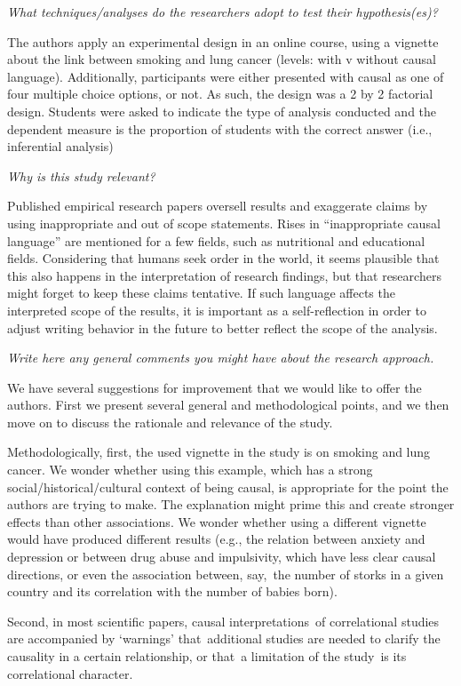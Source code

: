 \documentclass[10pt]{article}
\begin{document}
\emph{What techniques/analyses do the researchers adopt to test their
hypothesis(es)?}

The authors apply an experimental design in an online course, using a
vignette about the link between smoking and lung cancer (levels: with v
without causal language). Additionally, participants were either
presented with causal as one of four multiple choice options, or not. As
such, the design was a 2 by 2 factorial design. Students were asked to
indicate the type of analysis conducted and the dependent measure is the
proportion of students with the correct answer (i.e., inferential
analysis)

\emph{Why is this study relevant?}

Published empirical research papers oversell results and exaggerate
claims by using inappropriate and out of scope statements. Rises in
``inappropriate causal language'' are mentioned for a few fields, such
as nutritional and educational fields. Considering that humans seek
order in the world, it seems plausible that this also happens in the
interpretation of research findings, but that researchers might forget
to keep these claims tentative. If such language affects the interpreted
scope of the results, it is important as a self-reflection in order to
adjust writing behavior in the future to better reflect the scope of the
analysis.~

\emph{Write here any general comments you might have about the research
approach.}

We have several suggestions for improvement that we would like to offer
the authors. First we present several general and methodological points,
and we then move on to discuss the rationale and relevance of the study.
~

Methodologically, first, the used vignette in the study is on smoking
and lung cancer. We wonder whether using this example, which has a
strong social/historical/cultural context of being causal, is
appropriate for the point the authors are trying to make. The
explanation might prime this and create stronger effects than other
associations. We wonder whether using a different vignette would have
produced different results (e.g., the relation between anxiety and
depression or between drug abuse and impulsivity, which have less clear
causal directions, or even the association between, say,~the number of
storks in a given country and its correlation with the number of babies
born).~

Second, in most scientific papers, causal interpretations~of
correlational studies are accompanied by `warnings' that~additional
studies are needed to clarify the causality in a certain relationship,
or that~a limitation of the study~is its correlational character.
\end{document}
